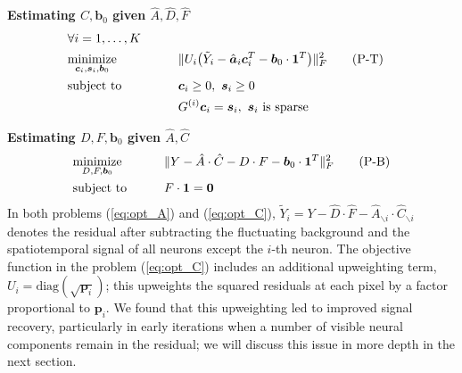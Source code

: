 \documentclass[10pt,letterpaper]{article}
\begin{document}
{\textbf{Estimating $C, \bm{b}_0$ given $\hat{A}, \hat{D}, \hat{F}$}
\begin{alignat}{2}
& \forall i=1, \hdots, K\notag\\
&\underset{\bm{c}_i,\bm{s}_i, \bm{b}_0}{\text{minimize}} &\qquad& \|U_i \big(\tilde{Y}_i-\hat{\bm{a}}_i\bm{c}_i^T-  {\bm{b}}_0\cdot \bm{1}^T\big)\|_F^2 \label{eq:opt_C}\tag{P-T}\\
&\text{subject to} &&\bm{c}_i\geq 0, ~\bm{s}_i\geq 0\notag\\
&&&G^{(i)}\bm{c}_i = \bm{s}_i, ~ \bm{s}_i \text{ is sparse}\notag
\end{alignat}

\textbf{Estimating $D, F, {\bm{b}}_0$ given $\hat{A}, \hat{C}$ }
\begin{alignat}{2}
&\underset{D, F, \bm{b}_0}{\text{minimize}} &\qquad& \|Y-\hat{A}\cdot \hat{C} - D\cdot F- \bm{b}_0\cdot \bm{1}^T\|_F^2 \label{eq:opt_B}\tag{P-B}\\
&\text{subject to} && F\cdot \bm{1} = \bm{0}\notag \notag 
\end{alignat}
In both problems (\ref{eq:opt_A}) and (\ref{eq:opt_C}), $\tilde{Y}_i = Y-\hat{D}\cdot \hat{F} - \hat{A}_{\backslash i}\cdot \hat{C}_{\backslash i}$ denotes the residual after subtracting the fluctuating background and the spatiotemporal signal of all neurons except the $i$-th neuron. 
The objective function in the problem (\ref{eq:opt_C}) includes an additional upweighting term, $U_i = \text{diag}(\sqrt{\bm{p}_i})$; this upweights the squared residuals at each pixel by a factor proportional to $\bm{p}_i$. We found that this upweighting led to improved signal recovery, particularly in early iterations when a number of visible neural components remain in the residual; we will discuss this issue in more depth in the next section. 



}
\end{document}
